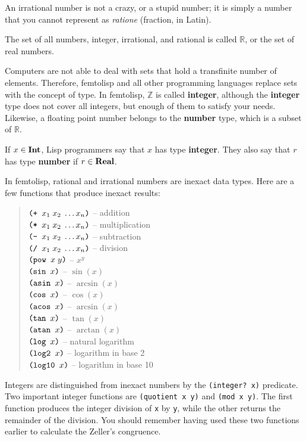 \documentclass[a4paper,12pt]{book}
\begin{document}
An irrational number
is not a crazy, or a stupid number; it is simply a number that you cannot represent
as {\em ratione} (fraction, in Latin).

The set of all numbers, integer, 
irrational, and rational is called $\mathbb{R}$, or
the set of real numbers. 

Computers are not able to deal
with sets that hold a transfinite number of
elements. Therefore, femtolisp and
all other programming languages
replace sets with the concept of type.
In femtolisp, $\mathbb{Z}$ is 
called {\bf integer}, although
the {\bf integer} type does not cover all integers, 
but enough of them to satisfy
your needs. Likewise, a floating point
 number belongs to the {\bf number} type, 
which is a subset of $\mathbb{R}$.


If $x\in{\bf Int}$, Lisp programmers say that $x$ has type
\label{type:definition}  {\bf integer}. They also
say that $r$ has type {\bf number} if $r\in {\bf Real}$.

In femtolisp, rational and irrational numbers
are inexact data types. Here are a few functions
that produce inexact results:
\begin{quote}
$\verb|(+ |x_1\;x_2\;\ldots x_n\verb|)|$ -- addition\\
$\verb|(* |x_1\;x_2\;\ldots x_n\verb|)|$ -- multiplication\\
$\verb|(- |x_1\;x_2\;\ldots x_n\verb|)|$ -- subtraction\\
$\verb|(/ |x_1\;x_2\;\ldots x_n\verb|)|$ -- division\\
$\verb|(pow |x\;y\verb|)|$ -- $x^y$\\
$\verb|(sin | x \verb|)|$ -- $\sin(x)$\\
$\verb|(asin | x \verb|)|$ -- $\arcsin(x)$\\
$\verb|(cos | x \verb|)|$ -- $\cos(x)$\\
$\verb|(acos | x \verb|)|$ -- $\arcsin(x)$\\ 
$\verb|(tan | x \verb|)|$ -- $\tan(x)$\\
$\verb|(atan | x \verb|)|$ -- $\arctan(x)$\\
$\verb|(log | x \verb|)|$ -- natural logarithm\\
$\verb|(log2 | x \verb|)|$ -- logarithm in base 2\\
$\verb|(log10 | x \verb|)|$ -- logarithm in base 10
\end{quote}
Integers are distinguished from inexact numbers
by the \verb|(integer? x)| predicate. Two important
integer functions are \verb|(quotient x y)| and
\verb|(mod x y)|. The first function
produces the integer division of \verb|x|
by \verb|y|, while the other returns
the remainder of the division. You should remember
having used
these two functions earlier to calculate the Zeller's
congruence.
\end{document}
